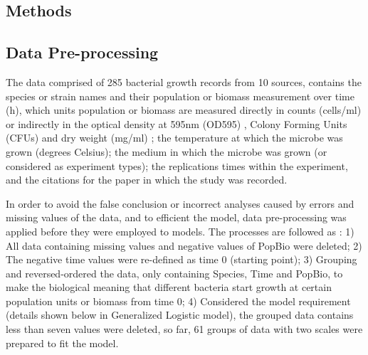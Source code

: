 \documentclass[a4paper]{report}
\begin{document}
\begin{linenumbers}
    \section{Methods}
    
        \subsection{Data Pre-processing}
        The data comprised of 285 bacterial growth records from 10 sources, contains the species or strain names and their population or biomass measurement  over time (h), which units population or biomass are measured directly in counts (cells/ml) \citep{phillips1987relation, gill1991growth, zwietering1994modeling, bernhardt2018metabolic, silva2018modelling} or indirectly in the optical density at 595nm (OD595) \citep{bae2014growth}, Colony Forming Units (CFUs) \citep{stannard1985temperature, roth1962continuity, galarz2016predicting} and dry weight (mg/ml) \citep{sivonen1990effects}; the temperature at which the microbe was grown (degrees Celsius); the medium in which the microbe was grown (or considered as experiment types); the replications times within the experiment, and the citations for the paper in which the study was recorded. 

        In order to avoid the false conclusion or incorrect analyses caused by errors and missing values of the data, and to efficient the model, data pre-processing was applied before they were employed to models. The processes are followed as : 1) All data containing missing values and negative values of PopBio were deleted; 2) The negative time values were re-defined as time 0 (starting point); 3) Grouping and reversed-ordered the data, only containing Species, Time and PopBio, to make the biological meaning that different bacteria start growth at certain population units or biomass from time 0; 4) Considered the model requirement (details shown below in Generalized Logistic model), the grouped data contains less than seven values were deleted, so far, 61 groups of data with two scales were prepared to fit the model.


\end{linenumbers}
\end{document}
